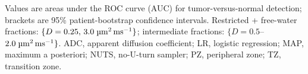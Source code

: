 \begin{table}[p]
\smallskip
{\footnotesize\raggedright
Values are areas under the ROC curve (AUC) for tumor-versus-normal detection;
brackets are 95\% patient-bootstrap confidence intervals. Restricted + free-water fractions:
$\{D = 0.25,\,3.0\;\si{\micro\meter\squared\per\milli\second}\}$; intermediate fractions: $\{D = 0.5$--$2.0\;\si{\micro\meter\squared\per\milli\second}\}$.
ADC, apparent diffusion coefficient; LR, logistic regression; MAP, maximum a
posteriori; NUTS, no-U-turn sampler; PZ, peripheral zone; TZ, transition
zone.\par}
\end{table}
